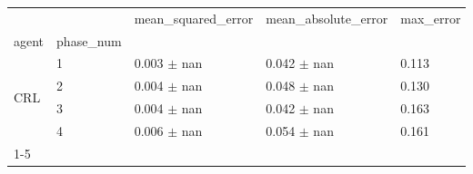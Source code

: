 \begin{tabular}{lllll}
\toprule
 &  & mean_squared_error & mean_absolute_error & max_error \\
agent & phase_num &  &  &  \\
\midrule
\multirow[t]{4}{*}{CRL} & 1 & 0.003 $\pm$ nan & 0.042 $\pm$ nan & 0.113 \\
 & 2 & 0.004 $\pm$ nan & 0.048 $\pm$ nan & 0.130 \\
 & 3 & 0.004 $\pm$ nan & 0.042 $\pm$ nan & 0.163 \\
 & 4 & 0.006 $\pm$ nan & 0.054 $\pm$ nan & 0.161 \\
\cline{1-5}
\bottomrule
\end{tabular}
